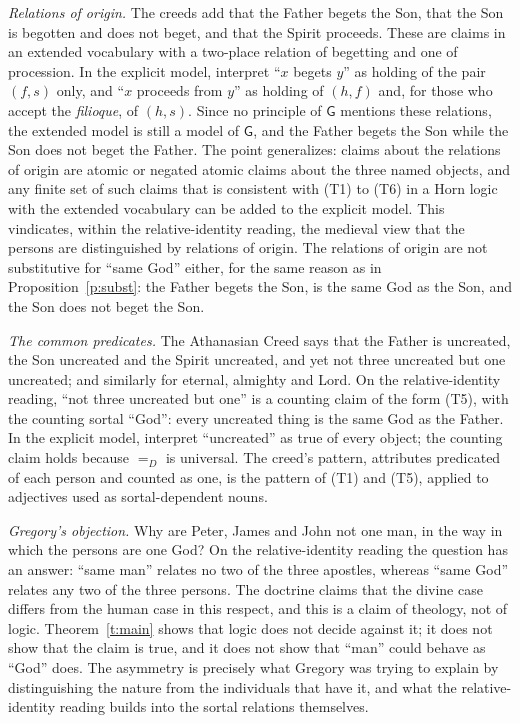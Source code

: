 \documentclass{situationist-preprint}
\begin{document}
\emph{Relations of origin.} The creeds add that the Father begets the Son, that the Son is begotten and does not beget, and that the Spirit proceeds. These are claims in an extended vocabulary with a two-place relation of begetting and one of procession. In the explicit model, interpret \enquote{$x$ begets $y$} as holding of the pair $(f, s)$ only, and \enquote{$x$ proceeds from $y$} as holding of $(h, f)$ and, for those who accept the \emph{filioque}, of $(h, s)$. Since no principle of $\mathsf{G}$ mentions these relations, the extended model is still a model of $\mathsf{G}$, and the Father begets the Son while the Son does not beget the Father. The point generalizes: claims about the relations of origin are atomic or negated atomic claims about the three named objects, and any finite set of such claims that is consistent with (T1) to (T6) in a Horn logic with the extended vocabulary can be added to the explicit model. This vindicates, within the relative-identity reading, the medieval view that the persons are distinguished by relations of origin. The relations of origin are not substitutive for \enquote{same God} either, for the same reason as in Proposition~\ref{p:subst}: the Father begets the Son, is the same God as the Son, and the Son does not beget the Son.

\emph{The common predicates.} The Athanasian Creed says that the Father is uncreated, the Son uncreated and the Spirit uncreated, and yet not three uncreated but one uncreated; and similarly for eternal, almighty and Lord. On the relative-identity reading, \enquote{not three uncreated but one} is a counting claim of the form (T5), with the counting sortal \enquote{God}: every uncreated thing is the same God as the Father. In the explicit model, interpret \enquote{uncreated} as true of every object; the counting claim holds because $=_D$ is universal. The creed's pattern, attributes predicated of each person and counted as one, is the pattern of (T1) and (T5), applied to adjectives used as sortal-dependent nouns.

\emph{Gregory's objection.} Why are Peter, James and John not one man, in the way in which the persons are one God? On the relative-identity reading the question has an answer: \enquote{same man} relates no two of the three apostles, whereas \enquote{same God} relates any two of the three persons. The doctrine claims that the divine case differs from the human case in this respect, and this is a claim of theology, not of logic. Theorem~\ref{t:main} shows that logic does not decide against it; it does not show that the claim is true, and it does not show that \enquote{man} could behave as \enquote{God} does. The asymmetry is precisely what Gregory was trying to explain by distinguishing the nature from the individuals that have it, and what the relative-identity reading builds into the sortal relations themselves.
\end{document}
